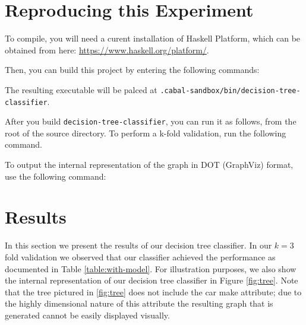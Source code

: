 \documentclass[letterpaper,12pt]{article}
\begin{document}
\section{Reproducing this Experiment}
\label{sec:reproduction}
To compile, you will need a curent installation of Haskell Platform,
which can be obtained from here: \href{https://www.haskell.org/platform/}{https://www.haskell.org/platform/}.

Then, you can build this project by entering the following commands:

The resulting executable will be palced at \texttt{.cabal-sandbox/bin/decision-tree-classifier}.

After you build \texttt{decision-tree-classifier}, you can run it as follows,
from the root of the source directory. To perform a k-fold validation,
run the following command. 


To output the internal representation of the graph in DOT (GraphViz)
format, use the following command:


\section{Results}
 

In this section we present the results of our decision tree classifier. In our $k=3$ fold validation we observed that our classifier achieved the performance as documented in Table \ref{table:with-model}. For illustration purposes, we also show the internal representation of our decision tree classifier in Figure \ref{fig:tree}. Note that the tree pictured in \ref{fig:tree} does not include the car make attribute; due to the highly dimensional nature of this attribute the resulting graph that is generated cannot be easily displayed visually. 
\end{document}
